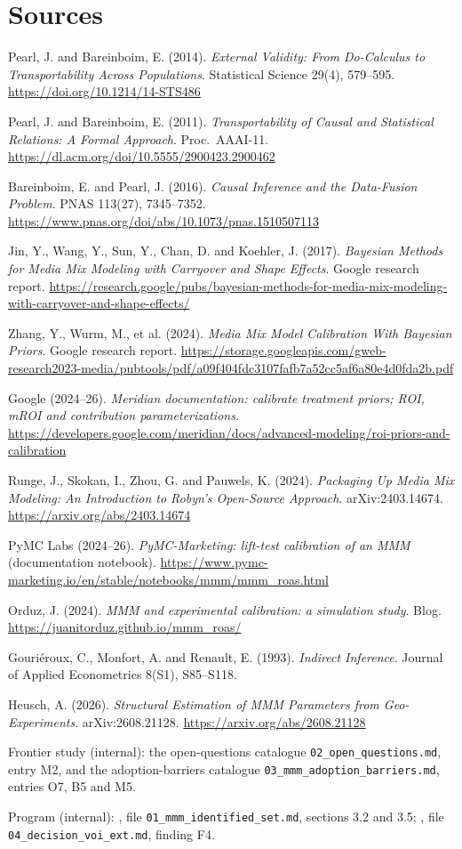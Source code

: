 \section*{Sources}
\begingroup\raggedright
\begin{enumerate}[label={[\arabic*]},leftmargin=2.5em]
\item Pearl, J. and Bareinboim, E. (2014). \emph{External Validity: From Do-Calculus to Transportability Across Populations}. Statistical Science 29(4), 579--595. \url{https://doi.org/10.1214/14-STS486}
\item Pearl, J. and Bareinboim, E. (2011). \emph{Transportability of Causal and Statistical Relations: A Formal Approach}. Proc.\ AAAI-11. \url{https://dl.acm.org/doi/10.5555/2900423.2900462}
\item Bareinboim, E. and Pearl, J. (2016). \emph{Causal Inference and the Data-Fusion Problem}. PNAS 113(27), 7345--7352. \url{https://www.pnas.org/doi/abs/10.1073/pnas.1510507113}
\item Jin, Y., Wang, Y., Sun, Y., Chan, D. and Koehler, J. (2017). \emph{Bayesian Methods for Media Mix Modeling with Carryover and Shape Effects}. Google research report. \url{https://research.google/pubs/bayesian-methods-for-media-mix-modeling-with-carryover-and-shape-effects/}
\item Zhang, Y., Wurm, M., et al. (2024). \emph{Media Mix Model Calibration With Bayesian Priors}. Google research report. \url{https://storage.googleapis.com/gweb-research2023-media/pubtools/pdf/a09f404fdc3107fafb7a52cc5af6a80e4d0fda2b.pdf}
\item Google (2024--26). \emph{Meridian documentation: calibrate treatment priors; ROI, mROI and contribution parameterizations}. \url{https://developers.google.com/meridian/docs/advanced-modeling/roi-priors-and-calibration}
\item Runge, J., Skokan, I., Zhou, G. and Pauwels, K. (2024). \emph{Packaging Up Media Mix Modeling: An Introduction to Robyn's Open-Source Approach}. arXiv:2403.14674. \url{https://arxiv.org/abs/2403.14674}
\item PyMC Labs (2024--26). \emph{PyMC-Marketing: lift-test calibration of an MMM} (documentation notebook). \url{https://www.pymc-marketing.io/en/stable/notebooks/mmm/mmm_roas.html}
\item Orduz, J. (2024). \emph{MMM and experimental calibration: a simulation study}. Blog. \url{https://juanitorduz.github.io/mmm_roas/}
\item Gouri\'eroux, C., Monfort, A. and Renault, E. (1993). \emph{Indirect Inference}. Journal of Applied Econometrics 8(S1), S85--S118.
\item Heusch, A. (2026). \emph{Structural Estimation of MMM Parameters from Geo-Experiments}. arXiv:2608.21128. \url{https://arxiv.org/abs/2608.21128}
\item Frontier study (internal): the open-questions catalogue \texttt{02\_open\_questions.md}, entry M2, and the adoption-barriers catalogue \texttt{03\_mmm\_adoption\_barriers.md}, entries O7, B5 and M5.
\item Program (internal): , file \texttt{01\_mmm\_identified\_set.md}, sections 3.2 and 3.5; , file \texttt{04\_decision\_voi\_ext.md}, finding F4.
\end{enumerate}
\endgroup
